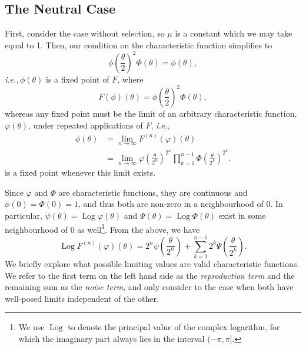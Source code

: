 \documentclass{article}
\newcommand{\ie}{\textit{i.e.,}\,}
\newcommand{\1}{\mathbbm{1}}
\DeclareMathOperator*{\Log}{Log}
\theoremstyle{remark}
\theoremstyle{definition}
\begin{document}
\subsection{The Neutral Case}

First, consider the case without selection, so $\mu$ is a constant
which we may take equal to 1.  Then, our condition on the characteristic function simplifies to
\begin{equation}\label{eq:CF_neutral}
	{\textstyle \phi\left(\frac{\theta}{2}\right)^{2}} \Phi(\theta) %
	= \phi(\theta) ,
\end{equation}
\ie $\phi(\theta)$ is a fixed point of $F$, where
 \[
	F(\phi)(\theta) = {\textstyle \phi\left(\frac{\theta}{2}\right)^{2}} \Phi(\theta),
\]
whereas any fixed point must be the limit of an arbitrary characteristic function, $\varphi(\theta)$, under repeated applications of $F$,
\ie
\begin{align*}
	\phi(\theta) 
    &= \lim_{n \to \infty} F^{(n)}(\varphi)(\theta) \\
    &= \lim_{n \to \infty} \varphi\left(\frac{\theta}{2^{n}}\right)^{2^{n}}\prod_{k=1}^{n-1}\Phi\left(\frac{\theta}{2^{k}}\right)^{2^{k}} .
\end{align*}
is a fixed point whenever this limit exists.  

Since $\varphi$ and $\Phi$ are characteristic functions, they are continuous and $\phi(0) = \Phi(0) = 1$, and thus both are non-zero in a neighbourhood of 0. In particular, $\psi(\theta) = \Log{\varphi}(\theta)$ and $\Psi(\theta) = \Log{\Phi(\theta)}$ exist in some neighbourhood of 0 as well\footnote{We use $\Log$ to denote the principal value of the complex logarithm, for which the imaginary part always lies in the interval $(-\pi,\pi]$.}.  From the above, we have
\[
	\Log{F^{(n)}(\varphi)(\theta)} = {\textstyle 2^{n} \psi\left(\frac{\theta}{2^{n}}\right)} 
		+ \sum_{k=1}^{n-1}  {\textstyle 2^{k} \Psi\left(\frac{\theta}{2^{k}}\right)}.
\]
We briefly explore what possible limiting values are valid characteristic functions.  We refer to the first term on the left hand side as the \emph{reproduction term} and the remaining sum as the \emph{noise term}, and only consider to the case when both have well-posed limits independent of the other.
\end{document}
